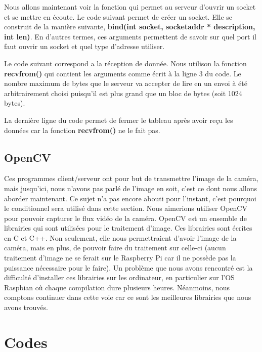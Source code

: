 \documentclass[a4paper,11pt]{report}
\begin{document}
{Nous allons maintenant voir la fonction qui permet au serveur d'ouvrir un socket et se mettre en écoute. Le code suivant permet de créer un socket. Elle se construit de la manière suivante, \textbf{bind(int socket, socketaddr * description, int len)}. En d'autres termes, ces arguments permettent de savoir sur quel port il faut ouvrir un socket et quel type d'adresse utiliser. 



Le code suivant correspond a la réception de donnée. Nous utilison la fonction \textbf{recvfrom()} qui contient les arguments comme écrit à la ligne 3 du code. Le nombre maximum de bytes que le serveur va accepter de lire en un envoi à été arbitrairement choisi puisqu'il est plus grand que un bloc de bytes (soit 1024 bytes). 


La dernière ligne du code permet de fermer le tableau après avoir reçu les données car la fonction \textbf{recvfrom()} ne le fait pas.




\subsection{OpenCV}
Ces programmes client/serveur ont pour but de transmettre l'image de la caméra, mais jusqu'ici, nous n'avons pas parlé de l'image en soit, c'est ce dont nous allons aborder maintenant. Ce sujet n'a pas encore abouti pour l'instant, c'est pourquoi le conditionnel sera utilisé dans cette section. Nous aimerions utiliser OpenCV pour pouvoir capturer le flux vidéo de la caméra. OpenCV est un ensemble de librairies qui sont utilisées pour le traitement d'image. Ces librairies sont écrites en C et C++. Non seulement, elle nous permettraient d'avoir l'image de la caméra, mais en plus, de pouvoir faire du traitement sur celle-ci (aucun traitement d'image ne se ferait sur le Raspberry Pi car il ne possède pas la puissance nécessaire  pour le faire). Un problème que nous avons rencontré est la difficulté d'installer ces librairies sur les ordinateur, en particulier sur l'OS Raspbian où chaque compilation dure plusieurs heures. Néanmoins, nous comptons continuer dans cette voie car ce sont les meilleures librairies que nous avons trouvés.

\section{Codes}

}
\end{document}
